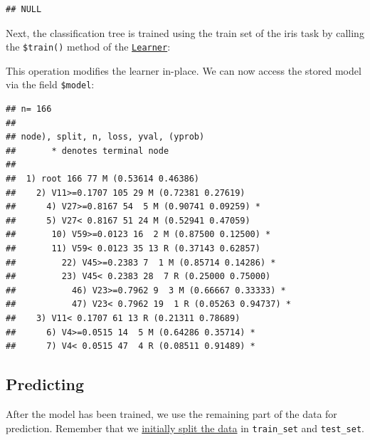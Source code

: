 \documentclass[]{scrbook}
\newenvironment{Shaded}{\begin{snugshade}}{\end{snugshade}}
\newcommand{\DataTypeTok}[1]{\textcolor[rgb]{0.13,0.29,0.53}{#1}}
\newcommand{\KeywordTok}[1]{\textcolor[rgb]{0.13,0.29,0.53}{\textbf{#1}}}
\newcommand{\NormalTok}[1]{#1}
\newcommand{\OperatorTok}[1]{\textcolor[rgb]{0.81,0.36,0.00}{\textbf{#1}}}
\renewenvironment{Shaded} {\begin{snugshade}\small} {\end{snugshade}}
\begin{document}
\begin{verbatim}
## NULL
\end{verbatim}

Next, the classification tree is trained using the train set of the iris task by calling the \texttt{\$train()} method of the \href{https://mlr3.mlr-org.com/reference/Learner.html}{\texttt{Learner}}:

\begin{Shaded}
\end{Shaded}

This operation modifies the learner in-place.
We can now access the stored model via the field \texttt{\$model}:

\begin{Shaded}
\end{Shaded}

\begin{verbatim}
## n= 166 
## 
## node), split, n, loss, yval, (yprob)
##       * denotes terminal node
## 
##  1) root 166 77 M (0.53614 0.46386)  
##    2) V11>=0.1707 105 29 M (0.72381 0.27619)  
##      4) V27>=0.8167 54  5 M (0.90741 0.09259) *
##      5) V27< 0.8167 51 24 M (0.52941 0.47059)  
##       10) V59>=0.0123 16  2 M (0.87500 0.12500) *
##       11) V59< 0.0123 35 13 R (0.37143 0.62857)  
##         22) V45>=0.2383 7  1 M (0.85714 0.14286) *
##         23) V45< 0.2383 28  7 R (0.25000 0.75000)  
##           46) V23>=0.7962 9  3 M (0.66667 0.33333) *
##           47) V23< 0.7962 19  1 R (0.05263 0.94737) *
##    3) V11< 0.1707 61 13 R (0.21311 0.78689)  
##      6) V4>=0.0515 14  5 M (0.64286 0.35714) *
##      7) V4< 0.0515 47  4 R (0.08511 0.91489) *
\end{verbatim}

\hypertarget{predicting}{%
\subsection{Predicting}\label{predicting}}

After the model has been trained, we use the remaining part of the data for prediction.
Remember that we \protect\hyperlink{split-data}{initially split the data} in \texttt{train\_set} and \texttt{test\_set}.
\end{document}
